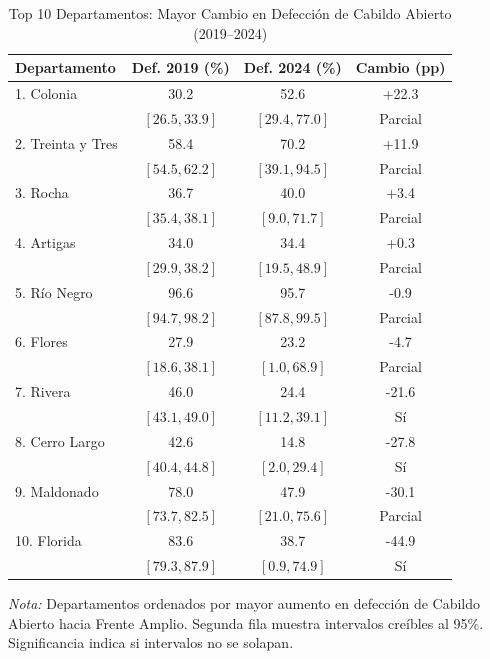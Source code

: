 \begin{table}[htbp]
\centering
\caption{Top 10 Departamentos: Mayor Cambio en Defección de Cabildo Abierto (2019--2024)}
\label{tab:temporal_departments_top10}
\small
\begin{tabular}{lccc}
\toprule
{\textbf{Departamento}} & {\textbf{Def. 2019 (\%)}} & {\textbf{Def. 2024 (\%)}} & {\textbf{Cambio (pp)}} \\
\midrule
1. Colonia & 30.2 & 52.6 & +22.3 \\
 & $[26.5, 33.9]$ & $[29.4, 77.0]$ & {\footnotesize Parcial} \\
2. Treinta y Tres & 58.4 & 70.2 & +11.9 \\
 & $[54.5, 62.2]$ & $[39.1, 94.5]$ & {\footnotesize Parcial} \\
3. Rocha & 36.7 & 40.0 & +3.4 \\
 & $[35.4, 38.1]$ & $[9.0, 71.7]$ & {\footnotesize Parcial} \\
4. Artigas & 34.0 & 34.4 & +0.3 \\
 & $[29.9, 38.2]$ & $[19.5, 48.9]$ & {\footnotesize Parcial} \\
5. Río Negro & 96.6 & 95.7 & -0.9 \\
 & $[94.7, 98.2]$ & $[87.8, 99.5]$ & {\footnotesize Parcial} \\
6. Flores & 27.9 & 23.2 & -4.7 \\
 & $[18.6, 38.1]$ & $[1.0, 68.9]$ & {\footnotesize Parcial} \\
7. Rivera & 46.0 & 24.4 & -21.6 \\
 & $[43.1, 49.0]$ & $[11.2, 39.1]$ & {\footnotesize Sí} \\
8. Cerro Largo & 42.6 & 14.8 & -27.8 \\
 & $[40.4, 44.8]$ & $[2.0, 29.4]$ & {\footnotesize Sí} \\
9. Maldonado & 78.0 & 47.9 & -30.1 \\
 & $[73.7, 82.5]$ & $[21.0, 75.6]$ & {\footnotesize Parcial} \\
10. Florida & 83.6 & 38.7 & -44.9 \\
 & $[79.3, 87.9]$ & $[0.9, 74.9]$ & {\footnotesize Sí} \\
\bottomrule
\end{tabular}
\begin{flushleft}
\small \textit{Nota:} Departamentos ordenados por mayor aumento en defección de Cabildo Abierto hacia Frente Amplio. Segunda fila muestra intervalos creíbles al 95\%. Significancia indica si intervalos no se solapan.
\end{flushleft}
\end{table}
